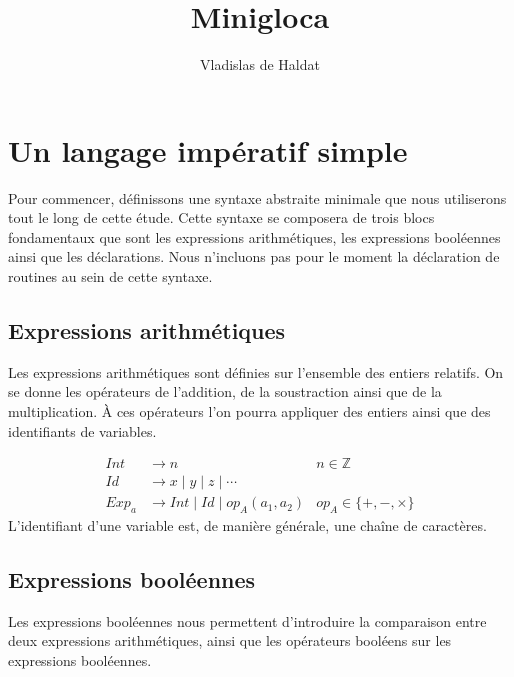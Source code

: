 \documentclass[a4paper, 12pt]{article}
\title{Minigloca}
\author{Vladislas de Haldat}
\begin{document}


\maketitle
\newpage
\tableofcontents
\newpage

\section{Un langage impératif simple}
Pour commencer, définissons une syntaxe abstraite minimale que nous utiliserons tout le long de cette étude.
Cette syntaxe se composera de trois blocs fondamentaux que sont les expressions arithmétiques, les expressions
booléennes ainsi que les déclarations. Nous n'incluons pas pour le moment la déclaration de routines au sein de cette syntaxe.

\subsection{Expressions arithmétiques}
Les expressions arithmétiques sont définies sur l'ensemble des entiers relatifs. On se donne les opérateurs
de l'addition, de la soustraction ainsi que de la multiplication. À ces opérateurs l'on pourra appliquer des
entiers ainsi que des identifiants de variables.


\begin{align*}
  Int   & \rightarrow n                               & n \in \mathbb{Z}          \\
  Id    & \rightarrow x \mid y \mid z \mid \cdots                                 \\
  Exp_a & \rightarrow Int \mid Id \mid op_A(a_1, a_2) & op_A \in \{+, -, \times\}
\end{align*}
L'identifiant d'une variable est, de manière générale, une chaîne de caractères.

\subsection{Expressions booléennes}
Les expressions booléennes nous permettent d'introduire la comparaison entre deux expressions arithmétiques,
ainsi que les opérateurs booléens sur les expressions booléennes.
\end{document}
